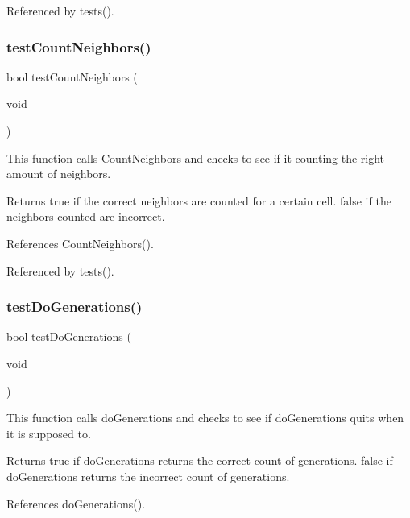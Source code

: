 Referenced by tests().

\mbox{\label{tests_8h_a75eb3d149c9fa363b42cccfb3d53a65a}} 
\subsubsection{test\+Count\+Neighbors()}
{\footnotesize\ttfamily bool test\+Count\+Neighbors (\begin{DoxyParamCaption}\item[{void}]{ }\end{DoxyParamCaption})}

This function calls Count\+Neighbors and checks to see if it counting the right amount of neighbors.

\begin{DoxyReturn}{Returns}
true if the correct neighbors are counted for a certain cell. false if the neighbors counted are incorrect. 
\end{DoxyReturn}


References Count\+Neighbors().



Referenced by tests().

\mbox{\label{tests_8h_a9064028f30ed56e9fc83c749eb75362f}} 
\subsubsection{test\+Do\+Generations()}
{\footnotesize\ttfamily bool test\+Do\+Generations (\begin{DoxyParamCaption}\item[{void}]{ }\end{DoxyParamCaption})}

This function calls do\+Generations and checks to see if do\+Generations quits when it is supposed to.

\begin{DoxyReturn}{Returns}
true if do\+Generations returns the correct count of generations. false if do\+Generations returns the incorrect count of generations. 
\end{DoxyReturn}


References do\+Generations().



